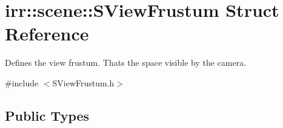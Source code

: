 \hypertarget{structirr_1_1scene_1_1SViewFrustum}{}\section{irr\+:\+:scene\+:\+:S\+View\+Frustum Struct Reference}
\label{structirr_1_1scene_1_1SViewFrustum}


Defines the view frustum. That\textquotesingle{}s the space visible by the camera.  




{\ttfamily \#include $<$S\+View\+Frustum.\+h$>$}

\subsection*{Public Types}
